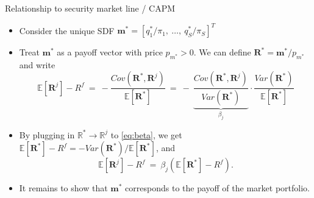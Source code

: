\documentclass[aspectratio=1610]{beamer}
\newcommand{\eq}{\ =\ }
\newcommand{\bb}{\mathbb}
\begin{document}
\begin{frame}{Relationship to security market line / CAPM}
\begin{itemize}
  \item Consider the unique SDF $\bm m^* = [q^*_1/\pi_1,\ \dots,\ q^*_S/\pi_S]^T$
  \item Treat $\bm m^*$ as a payoff vector with price $p_{m^*}>0$. We can define $\bm R^* = \bm m^*/p_{m^*}$ and write
  \begin{equation}\label{eq:beta}
    \bb E[\bm R^j] - R^f
    \eq -\frac{Cov(\bm R^*, \bm R^j)}{\bb E[\bm R^*]}
    \eq -\ \underset{\beta_j}{\underbrace{\frac{Cov(\bm R^*, \bm R^j)}{Var(\bm R^*)}}} \cdot \frac{Var(\bm R^*)}{\bb E[\bm R^*]}
  \end{equation}

  \item By plugging in $\bb R^* \rightarrow \bb R^j$ to \eqref{eq:beta}, we get $\bb E[\bm R^*] - R^f = -Var(\bm R^*)/\bb E[\bm R^*]$, and
  \begin{equation}
    \bb E[\bm R^j] - R^f \eq \beta_j\left(\bb E[\bm R^*] - R^f \right).
  \end{equation}

  \item It remains to show that $\bm m^*$ corresponds to the payoff of the market portfolio.
\end{itemize}
\end{frame}
\end{document}
